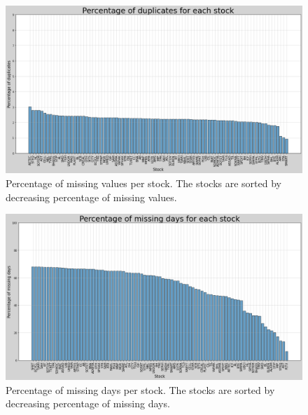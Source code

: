 \documentclass[11pt]{article}
\begin{document}
\begin{figure}[H]
    \centering
    \begin{minipage}[t]{0.75\textwidth}
        \includegraphics[width=\textwidth]{figures/preprocessing/bar_duplicates.png}
        \caption{Percentage of missing values per stock. The stocks are sorted by decreasing percentage of missing values.}
        \label{fig:bar_duplicates}
    \end{minipage}
\end{figure}

\begin{figure}[H]
    \centering
    \begin{minipage}[t]{0.75\textwidth}
        \includegraphics[width=\textwidth]{figures/preprocessing/bar_missing_days.png}
        \caption{Percentage of missing days per stock. The stocks are sorted by decreasing percentage of missing days.}
        \label{fig:bar_missing_days}
    \end{minipage}
\end{figure}
\end{document}
